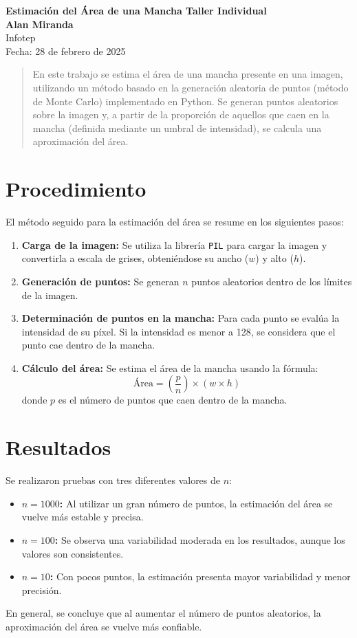 \documentclass[a4paper, 10pt]{article}
\begin{document}
\begin{center}
\textbf{Estimación del Área de una Mancha Taller Individual}\\[6pt]
\small
\textbf{Alan Miranda}\\[6pt]
Infotep \\[6pt]
Fecha: 28 de febrero de 2025
\end{center}

\begin{abstract}
En este trabajo se estima el área de una mancha presente en una imagen, utilizando un método basado en la generación aleatoria de puntos (método de Monte Carlo) implementado en Python. Se generan puntos aleatorios sobre la imagen y, a partir de la proporción de aquellos que caen en la mancha (definida mediante un umbral de intensidad), se calcula una aproximación del área. 
\end{abstract}

\section{Procedimiento}
El método seguido para la estimación del área se resume en los siguientes pasos:
\begin{enumerate}
    \item \textbf{Carga de la imagen:} Se utiliza la librería \texttt{PIL} para cargar la imagen y convertirla a escala de grises, obteniéndose su ancho (\(w\)) y alto (\(h\)).
    \item \textbf{Generación de puntos:} Se generan \(n\) puntos aleatorios dentro de los límites de la imagen.
    \item \textbf{Determinación de puntos en la mancha:} Para cada punto se evalúa la intensidad de su píxel. Si la intensidad es menor a 128, se considera que el punto cae dentro de la mancha.
    \item \textbf{Cálculo del área:} Se estima el área de la mancha usando la fórmula:
    \[
    \text{Área} = \left(\frac{p}{n}\right) \times (w \times h)
    \]
    donde \(p\) es el número de puntos que caen dentro de la mancha.
\end{enumerate}



\section{Resultados}
Se realizaron pruebas con tres diferentes valores de \( n \):
\begin{itemize}
    \item \textbf{\( n = 1000 \):} Al utilizar un gran número de puntos, la estimación del área se vuelve más estable y precisa.
    \item \textbf{\( n = 100 \):} Se observa una variabilidad moderada en los resultados, aunque los valores son consistentes.
    \item \textbf{\( n = 10 \):} Con pocos puntos, la estimación presenta mayor variabilidad y menor precisión.
\end{itemize}
En general, se concluye que al aumentar el número de puntos aleatorios, la aproximación del área se vuelve más confiable.
\end{document}
